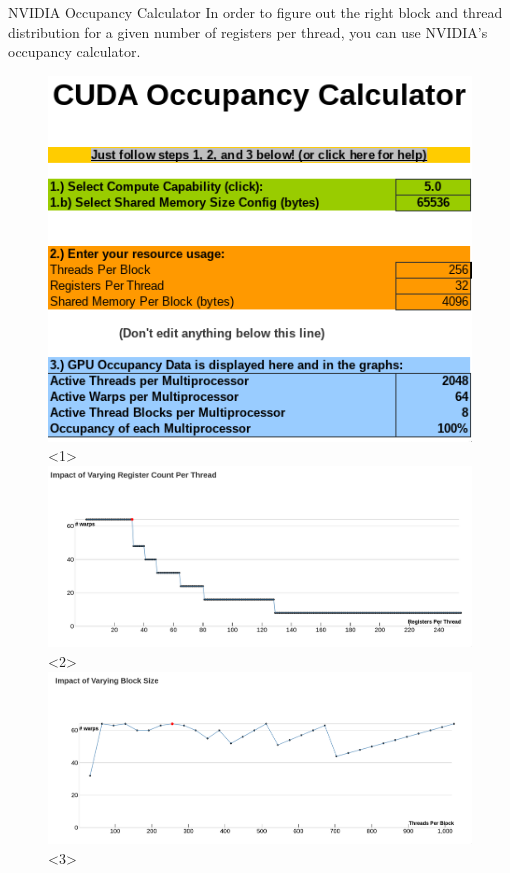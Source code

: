 \documentclass[9pt]{beamer}
\begin{document}
\begin{frame}[t]{NVIDIA Occupancy Calculator}
In order to figure out the right block and thread distribution for a given number of registers per thread, you can use NVIDIA's occupancy calculator. 

\begin{figure}
\begin{center}
\includegraphics[scale=0.5]{images/cuda_occupancy_calc.png}<1>
\includegraphics[scale=0.3]{images/cuda_occupancy_registers.png}<2>
\includegraphics[scale=0.3]{images/cuda_occupancy_threads.png}<3>

\end{center}
\end{figure}
\end{frame}
\end{document}
